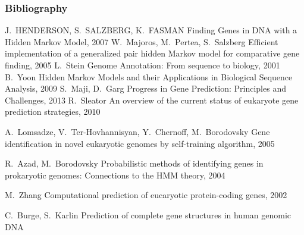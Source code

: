\documentclass{beamer}
\begin{document}
\begin{frame}[allowframebreaks]
  \frametitle<presentation>{Bibliography}    
  \begin{thebibliography}{10}   
  \beamertemplatearticlebibitems
  J.~HENDERSON, S.~SALZBERG, K.~FASMAN
    \newblock Finding Genes in DNA with a Hidden Markov Model, 2007
   \beamertemplatearticlebibitems
   	W.~Majoros, M.~Pertea, S.~Salzberg
   	\newblock Efficient implementation of a generalized pair hidden Markov
model for comparative gene finding, 2005
   \beamertemplatearticlebibitems
   	L.~Stein
   	\newblock Genome Annotation: From sequence to biology, 2001
   	\beamertemplatearticlebibitems
   	B.~Yoon
   	\newblock Hidden Markov Models and their Applications in Biological Sequence
Analysis, 2009
   	S.~Maji, D.~Garg  	
   	\newblock Progress in Gene Prediction: Principles and Challenges, 2013
   	R.~Sleator 	
   	\newblock An overview of the current status of eukaryote gene prediction strategies, 2010
   	
   	A.~Lomsadze, V.~Ter-Hovhannisyan, Y.~Chernoff, M.~Borodovsky
   	\newblock Gene identification in novel eukaryotic genomes by
self-training algorithm, 2005

   	R.~Azad, M.~Borodovsky
   	\newblock Probabilistic methods of identifying genes in prokaryotic genomes: Connections to the HMM theory, 2004
   	
   	M.~Zhang
   	\newblock Computational prediction of eucaryotic protein-coding genes, 2002
   	
   	C.~Burge, S.~Karlin
   	\newblock Prediction of complete gene structures in human genomic DNA   	
  \end{thebibliography}
\end{frame}






\end{document}
